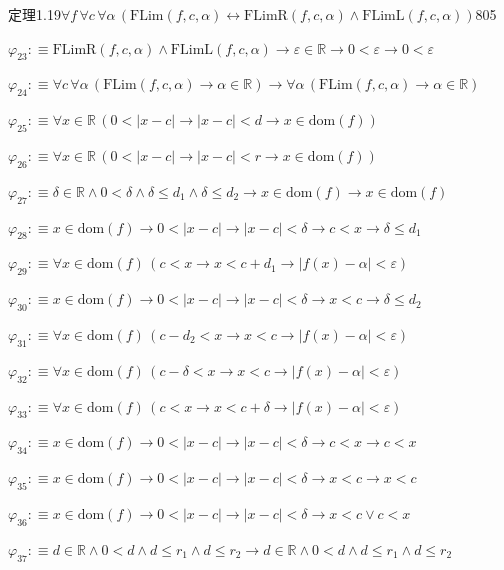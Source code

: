 \begin{fullproof}{定理1.19}{$\forall f\,\forall c\,\forall \alpha\,(\mathrm{FLim}(f,c,\alpha) \leftrightarrow \mathrm{FLimR}(f,c,\alpha) \land \mathrm{FLimL}(f,c,\alpha))$}{805}
\begin{abbrevlist}
\item $\varphi_{23} :\equiv \mathrm{FLimR}(f,c,\alpha) \land \mathrm{FLimL}(f,c,\alpha) \to \varepsilon \in \mathbb{R} \to 0 < \varepsilon \to 0 < \varepsilon$
\item $\varphi_{24} :\equiv \forall c\,\forall \alpha\,(\mathrm{FLim}(f,c,\alpha) \to \alpha \in \mathbb{R}) \to \forall \alpha\,(\mathrm{FLim}(f,c,\alpha) \to \alpha \in \mathbb{R})$
\item $\varphi_{25} :\equiv \forall x \in \mathbb{R}\,(0 < \lvert x - c \rvert \to \lvert x - c \rvert < d \to x \in \mathrm{dom}(f))$
\item $\varphi_{26} :\equiv \forall x \in \mathbb{R}\,(0 < \lvert x - c \rvert \to \lvert x - c \rvert < r \to x \in \mathrm{dom}(f))$
\item $\varphi_{27} :\equiv \delta \in \mathbb{R} \land 0 < \delta \land \delta \leq d_{1} \land \delta \leq d_{2} \to x \in \mathrm{dom}(f) \to x \in \mathrm{dom}(f)$
\item $\varphi_{28} :\equiv x \in \mathrm{dom}(f) \to 0 < \lvert x - c \rvert \to \lvert x - c \rvert < \delta \to c < x \to \delta \leq d_{1}$
\item $\varphi_{29} :\equiv \forall x \in \mathrm{dom}(f)\,(c < x \to x < c + d_{1} \to \lvert f(x) - \alpha \rvert < \varepsilon)$
\item $\varphi_{30} :\equiv x \in \mathrm{dom}(f) \to 0 < \lvert x - c \rvert \to \lvert x - c \rvert < \delta \to x < c \to \delta \leq d_{2}$
\item $\varphi_{31} :\equiv \forall x \in \mathrm{dom}(f)\,(c - d_{2} < x \to x < c \to \lvert f(x) - \alpha \rvert < \varepsilon)$
\item $\varphi_{32} :\equiv \forall x \in \mathrm{dom}(f)\,(c - \delta < x \to x < c \to \lvert f(x) - \alpha \rvert < \varepsilon)$
\item $\varphi_{33} :\equiv \forall x \in \mathrm{dom}(f)\,(c < x \to x < c + \delta \to \lvert f(x) - \alpha \rvert < \varepsilon)$
\item $\varphi_{34} :\equiv x \in \mathrm{dom}(f) \to 0 < \lvert x - c \rvert \to \lvert x - c \rvert < \delta \to c < x \to c < x$
\item $\varphi_{35} :\equiv x \in \mathrm{dom}(f) \to 0 < \lvert x - c \rvert \to \lvert x - c \rvert < \delta \to x < c \to x < c$
\item $\varphi_{36} :\equiv x \in \mathrm{dom}(f) \to 0 < \lvert x - c \rvert \to \lvert x - c \rvert < \delta \to x < c \lor c < x$
\item $\varphi_{37} :\equiv d \in \mathbb{R} \land 0 < d \land d \leq r_{1} \land d \leq r_{2} \to d \in \mathbb{R} \land 0 < d \land d \leq r_{1} \land d \leq r_{2}$

\end{abbrevlist}
\end{fullproof}
